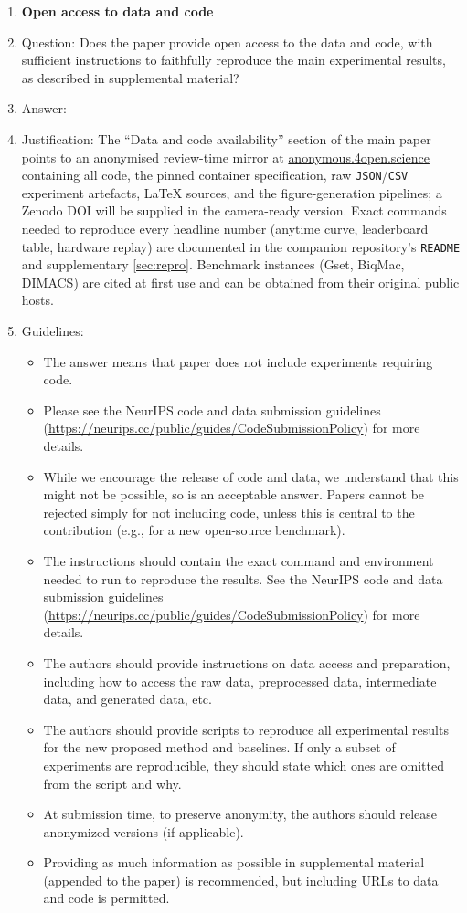 \begin{enumerate}
\item {\bf Open access to data and code}
    \item[] Question: Does the paper provide open access to the data and code, with sufficient instructions to faithfully reproduce the main experimental results, as described in supplemental material?
    \item[] Answer: \answerYes{} %
    \item[] Justification: The ``Data and code availability'' section of
        the main paper points to an anonymised review-time mirror at
        \url{anonymous.4open.science} containing all code, the pinned
        container specification, raw \texttt{JSON}/\texttt{CSV} experiment
        artefacts, \LaTeX{} sources, and the figure-generation
        pipelines; a Zenodo DOI will be supplied in the camera-ready
        version. Exact commands needed to reproduce every headline number
        (anytime curve, leaderboard table, hardware replay) are
        documented in the companion repository's \texttt{README} and
        supplementary \cref{sec:repro}. Benchmark instances (Gset, BiqMac,
        DIMACS) are cited at first use and can be obtained from their
        original public hosts.
    \item[] Guidelines:
    \begin{itemize}
        \item The answer \answerNA{} means that paper does not include experiments requiring code.
        \item Please see the NeurIPS code and data submission guidelines (\url{https://neurips.cc/public/guides/CodeSubmissionPolicy}) for more details.
        \item While we encourage the release of code and data, we understand that this might not be possible, so \answerNo{} is an acceptable answer. Papers cannot be rejected simply for not including code, unless this is central to the contribution (e.g., for a new open-source benchmark).
        \item The instructions should contain the exact command and environment needed to run to reproduce the results. See the NeurIPS code and data submission guidelines (\url{https://neurips.cc/public/guides/CodeSubmissionPolicy}) for more details.
        \item The authors should provide instructions on data access and preparation, including how to access the raw data, preprocessed data, intermediate data, and generated data, etc.
        \item The authors should provide scripts to reproduce all experimental results for the new proposed method and baselines. If only a subset of experiments are reproducible, they should state which ones are omitted from the script and why.
        \item At submission time, to preserve anonymity, the authors should release anonymized versions (if applicable).
        \item Providing as much information as possible in supplemental material (appended to the paper) is recommended, but including URLs to data and code is permitted.
    \end{itemize}



\end{enumerate}

